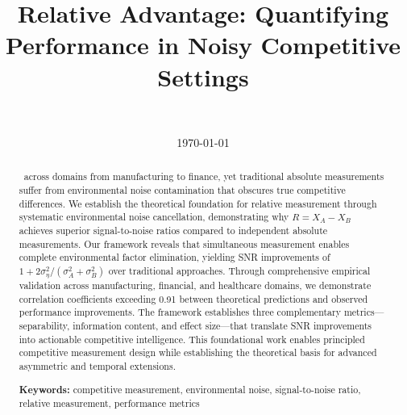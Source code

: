\documentclass[11pt,a4paper]{article}
\title{Relative Advantage: Quantifying Performance in Noisy Competitive Settings}
\author{
    \authorone \\
    \textit{\affiliationone}
}
\date{\today}
\begin{document}
\maketitle

\begin{abstract}
\competitivemeasurement\ across domains from manufacturing to finance, yet traditional absolute measurements suffer from environmental noise contamination that obscures true competitive differences. We establish the theoretical foundation for relative measurement through systematic environmental noise cancellation, demonstrating why $R = X_A - X_B$ achieves superior signal-to-noise ratios compared to independent absolute measurements. Our framework reveals that simultaneous measurement enables complete environmental factor elimination, yielding SNR improvements of $1 + 2\sigma_\eta^2/(\sigma_A^2 + \sigma_B^2)$ over traditional approaches. Through comprehensive empirical validation across manufacturing, financial, and healthcare domains, we demonstrate correlation coefficients exceeding 0.91 between theoretical predictions and observed performance improvements. The framework establishes three complementary metrics—separability, information content, and effect size—that translate SNR improvements into actionable competitive intelligence. This foundational work enables principled competitive measurement design while establishing the theoretical basis for advanced asymmetric and temporal extensions.

\textbf{Keywords:} competitive measurement, environmental noise, signal-to-noise ratio, relative measurement, performance metrics
\end{abstract}














\end{document}
